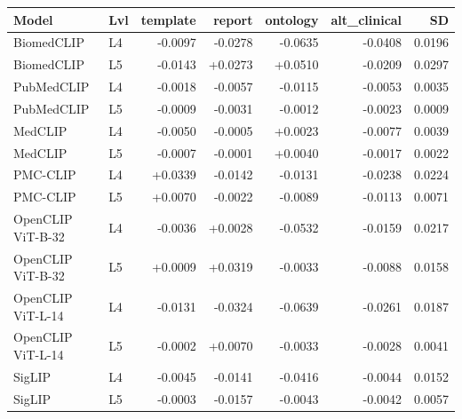 \begin{tabular}{llrrrrr}
\toprule
Model & Lvl & template & report & ontology & alt_clinical & SD \\
\midrule
BiomedCLIP & L4 & -0.0097 & -0.0278 & -0.0635 & -0.0408 & 0.0196 \\
BiomedCLIP & L5 & -0.0143 & +0.0273 & +0.0510 & -0.0209 & 0.0297 \\
PubMedCLIP & L4 & -0.0018 & -0.0057 & -0.0115 & -0.0053 & 0.0035 \\
PubMedCLIP & L5 & -0.0009 & -0.0031 & -0.0012 & -0.0023 & 0.0009 \\
MedCLIP & L4 & -0.0050 & -0.0005 & +0.0023 & -0.0077 & 0.0039 \\
MedCLIP & L5 & -0.0007 & -0.0001 & +0.0040 & -0.0017 & 0.0022 \\
PMC-CLIP & L4 & +0.0339 & -0.0142 & -0.0131 & -0.0238 & 0.0224 \\
PMC-CLIP & L5 & +0.0070 & -0.0022 & -0.0089 & -0.0113 & 0.0071 \\
OpenCLIP ViT-B-32 & L4 & -0.0036 & +0.0028 & -0.0532 & -0.0159 & 0.0217 \\
OpenCLIP ViT-B-32 & L5 & +0.0009 & +0.0319 & -0.0033 & -0.0088 & 0.0158 \\
OpenCLIP ViT-L-14 & L4 & -0.0131 & -0.0324 & -0.0639 & -0.0261 & 0.0187 \\
OpenCLIP ViT-L-14 & L5 & -0.0002 & +0.0070 & -0.0033 & -0.0028 & 0.0041 \\
SigLIP & L4 & -0.0045 & -0.0141 & -0.0416 & -0.0044 & 0.0152 \\
SigLIP & L5 & -0.0003 & -0.0157 & -0.0043 & -0.0042 & 0.0057 \\
\bottomrule
\end{tabular}
